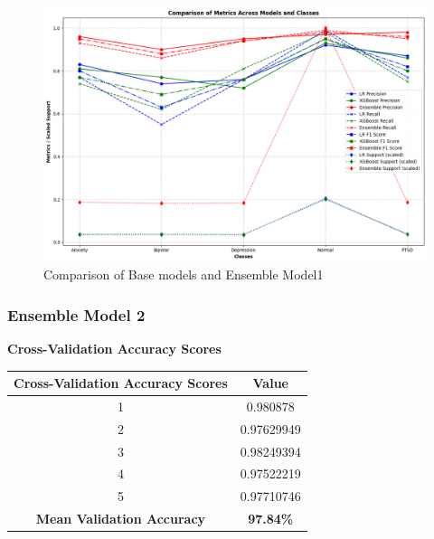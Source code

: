 \begin{figure}[h!]  
    \centering
    \includegraphics[width=1.0\textwidth]{Images/EM RESULT.png}  
    \caption{Comparison of Base models and Ensemble Model1}
    \label{dfdl1244883}  %
\end{figure}

\pagebreak

\subsubsection{Ensemble Model 2}

\begin{center}
    \textbf{Cross-Validation Accuracy Scores} \\[0.5em]
    \begin{tabular}{|c|c|}
        \hline
        \textbf{Cross-Validation Accuracy Scores} & \textbf{Value} \\ \hline
        1 & 0.980878 \\ \hline
        2 & 0.97629949 \\ \hline
        3 & 0.98249394 \\ \hline
        4 & 0.97522219 \\ \hline
        5 & 0.97710746 \\ \hline
        \textbf{Mean Validation Accuracy} & \textbf{97.84\%} \\ \hline
    \end{tabular}
\end{center}


